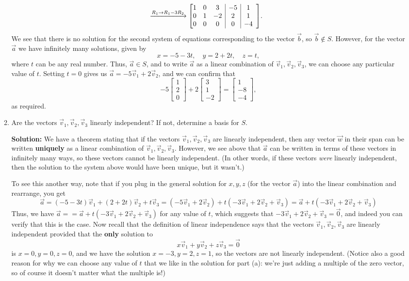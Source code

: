 \documentclass[12pt]{article}
\makeatletter
\newenvironment{abmatrix}[1]{%
  \left[\begin{array}{@{}*{#1}{c}|c|c}
}{%
  \end{array}\right]
}
\newcommand{\bbm}{\begin{bmatrix}}
\newcommand{\ebm}{\end{bmatrix}}
\makeatother
\begin{document}
\begin{enumerate}
\begin{enumerate}
\begin{align*}
&\xrightarrow{R_1\to R_1-3R_2}\begin{abmatrix}{3} 1&0&3&-5&1\\0&1&-2&2&1\\0&0&0&0&-4\end{abmatrix}.
\end{align*}
We see that there is no solution for the second system of equations corresponding to the vector $\vec{b}$, so $\vec{b}\notin S$. However, for the vector $\vec{a}$ we have infinitely many solutions, given by
\[
 x = -5-3t, \quad y = 2+2t, \quad z=t,
\]
where $t$ can be any real number. Thus, $\vec{a}\in S$, and to write $\vec{a}$ as a linear combination of $\vec{v}_1, \vec{v}_2, \vec{v}_3$, we can choose any particular value of $t$. Setting $t=0$ gives us $\vec{a} = -5\vec{v}_1+2\vec{v}_2$, and we can confirm that
\[
 -5\bbm 1\\2\\0\ebm + 2\bbm 3\\1\\-2\ebm = \bbm 1\\-8\\-4\ebm,
\]
as required.



 \item Are the vectors $\vec{v}_1, \vec{v}_2, \vec{v}_3$ linearly independent? If not, determine a basis for $S$.

\bigskip

\noindent\textbf{Solution:} We have a theorem stating that if the vectors $\vec{v}_1, \vec{v}_2, \vec{v}_3$ are linearly independent, then any vector $\vec{w}$ in their span can be written \textbf{uniquely} as a linear combination of $\vec{v}_1, \vec{v}_2, \vec{v}_3$. However, we see above that $\vec{a}$ can be written in terms of these vectors in infinitely many ways, so these vectors cannot be linearly independent. (In other words, if these vectors \textit{were} linearly independent, then the solution to the system above would have been unique, but it wasn't.)

To see this another way, note that if you plug in the general solution for $x,y,z$ (for the vector $\vec{a}$) into the linear combination and rearrange, you get
\[
 \vec{a} = (-5-3t)\vec{v}_1+(2+2t)\vec{v}_2 + t\vec{v}_3 = (-5\vec{v}_1+2\vec{v}_2) + t (-3\vec{v}_1+2\vec{v}_2+\vec{v}_3) = \vec{a}+t (-3\vec{v}_1+2\vec{v}_2+\vec{v}_3)
\]
Thus, we have $\vec{a}== \vec{a}+t (-3\vec{v}_1+2\vec{v}_2+\vec{v}_3)$ for any value of $t$, which suggests that $-3\vec{v}_1+2\vec{v}_2+\vec{v}_3=\vec{0}$, and indeed you can verify that this is the case. Now recall that the definition of linear independence says that the vectors $\vec{v}_1, \vec{v}_2, \vec{v}_3$ are linearly independent provided that the {\bf only} solution to
\[
 x\vec{v}_1+y\vec{v}_2+z\vec{v}_3 = \vec{0}
\]
is $x=0, y=0, z=0$, and we have the solution $x=-3, y=2, z=1$, so the vectors are not linearly independent. (Notice also a good reason for why we can choose any value of $t$ that we like in the solution for part (a): we're just adding a multiple of the zero vector, so of course it doesn't matter what the multiple is!)


\end{enumerate}
\end{enumerate}
\end{document}
